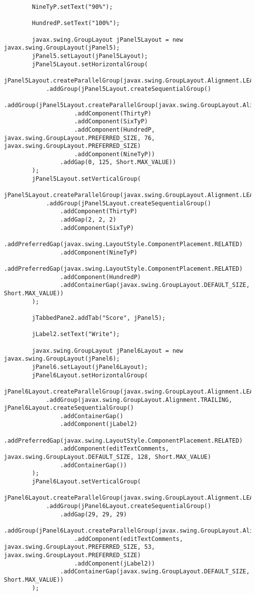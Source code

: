 \documentclass[12pt,a4paper]{article}
\begin{document}
\begin{lstlisting}
        NineTyP.setText("90%");

        HundredP.setText("100%");

        javax.swing.GroupLayout jPanel5Layout = new javax.swing.GroupLayout(jPanel5);
        jPanel5.setLayout(jPanel5Layout);
        jPanel5Layout.setHorizontalGroup(
            jPanel5Layout.createParallelGroup(javax.swing.GroupLayout.Alignment.LEADING)
            .addGroup(jPanel5Layout.createSequentialGroup()
                .addGroup(jPanel5Layout.createParallelGroup(javax.swing.GroupLayout.Alignment.LEADING)
                    .addComponent(ThirtyP)
                    .addComponent(SixTyP)
                    .addComponent(HundredP, javax.swing.GroupLayout.PREFERRED_SIZE, 76, javax.swing.GroupLayout.PREFERRED_SIZE)
                    .addComponent(NineTyP))
                .addGap(0, 125, Short.MAX_VALUE))
        );
        jPanel5Layout.setVerticalGroup(
            jPanel5Layout.createParallelGroup(javax.swing.GroupLayout.Alignment.LEADING)
            .addGroup(jPanel5Layout.createSequentialGroup()
                .addComponent(ThirtyP)
                .addGap(2, 2, 2)
                .addComponent(SixTyP)
                .addPreferredGap(javax.swing.LayoutStyle.ComponentPlacement.RELATED)
                .addComponent(NineTyP)
                .addPreferredGap(javax.swing.LayoutStyle.ComponentPlacement.RELATED)
                .addComponent(HundredP)
                .addContainerGap(javax.swing.GroupLayout.DEFAULT_SIZE, Short.MAX_VALUE))
        );

        jTabbedPane2.addTab("Score", jPanel5);

        jLabel2.setText("Write");

        javax.swing.GroupLayout jPanel6Layout = new javax.swing.GroupLayout(jPanel6);
        jPanel6.setLayout(jPanel6Layout);
        jPanel6Layout.setHorizontalGroup(
            jPanel6Layout.createParallelGroup(javax.swing.GroupLayout.Alignment.LEADING)
            .addGroup(javax.swing.GroupLayout.Alignment.TRAILING, jPanel6Layout.createSequentialGroup()
                .addContainerGap()
                .addComponent(jLabel2)
                .addPreferredGap(javax.swing.LayoutStyle.ComponentPlacement.RELATED)
                .addComponent(editTextComments, javax.swing.GroupLayout.DEFAULT_SIZE, 128, Short.MAX_VALUE)
                .addContainerGap())
        );
        jPanel6Layout.setVerticalGroup(
            jPanel6Layout.createParallelGroup(javax.swing.GroupLayout.Alignment.LEADING)
            .addGroup(jPanel6Layout.createSequentialGroup()
                .addGap(29, 29, 29)
                .addGroup(jPanel6Layout.createParallelGroup(javax.swing.GroupLayout.Alignment.BASELINE)
                    .addComponent(editTextComments, javax.swing.GroupLayout.PREFERRED_SIZE, 53, javax.swing.GroupLayout.PREFERRED_SIZE)
                    .addComponent(jLabel2))
                .addContainerGap(javax.swing.GroupLayout.DEFAULT_SIZE, Short.MAX_VALUE))
        );


\end{lstlisting}
\end{document}
